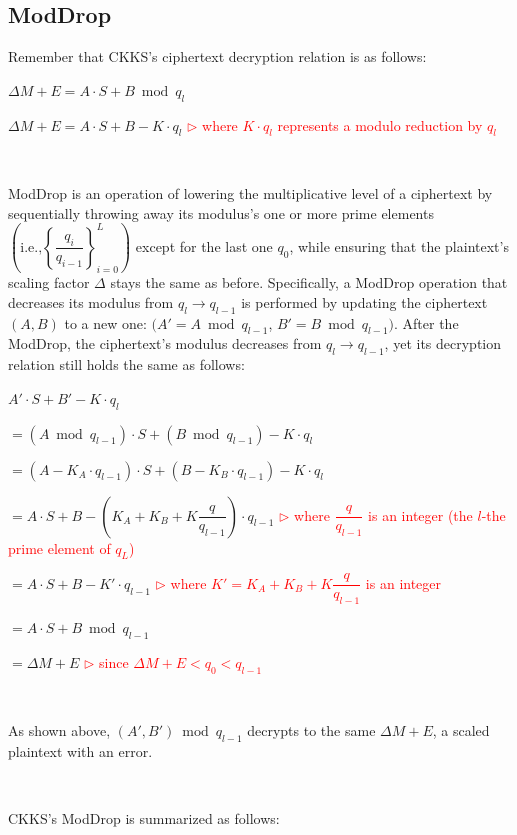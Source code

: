 \subsection{\textsf{ModDrop}}
\label{subsec:ckks-moddrop}

Remember that CKKS's ciphertext decryption relation is as follows:

$\Delta M + E = A \cdot S + B \bmod q_l$

$\Delta M + E = A \cdot S + B - K\cdot q_l$ \textcolor{red}{ $\rhd$ where $K\cdot q_l$ represents a modulo reduction by $q_l$}

$ $

\textsf{ModDrop} is an operation of lowering the multiplicative level of a ciphertext by sequentially throwing away its modulus's one or more prime elements $\left(\text{i.e.,} \left\{\dfrac{q_i}{q_{i-1}}\right\}_{i=0}^{L}\right)$ except for the last one $q_0$, while ensuring that the plaintext's scaling factor $\Delta$ stays the same as before. Specifically, a \textsf{ModDrop} operation that decreases its modulus from $q_l \rightarrow q_{l-1}$ is performed by updating the ciphertext $(A, B)$ to a new one: $\bm(A' = A \bmod q_{l-1}$, $B' = B \bmod q_{l-1})$. After the \textsf{ModDrop}, the ciphertext's modulus decreases from $q_l \rightarrow q_{l-1}$, yet its decryption relation still holds the same as follows:

$A' \cdot S + B' - K\cdot q_l $

$= (A \bmod q_{l-1}) \cdot S + (B \bmod q_{l-1}) - K\cdot q_l$

$= (A - K_A\cdot q_{l-1}) \cdot S + (B - K_B\cdot q_{l-1}) - K\cdot q_l$ 

$= A\cdot S + B - (K_A + K_B + K\dfrac{q}{q_{l-1}})\cdot q_{l-1}$
\textcolor{red}{ $\rhd$ where $\dfrac{q}{q_{l-1}}$ is an integer (the $l$-the prime element of $q_L$)}

$= A\cdot S + B - K'\cdot q_{l-1}$ \textcolor{red}{ $\rhd$ where $K' = K_A + K_B + K\dfrac{q}{q_{l-1}}$ is an integer}

$= A\cdot S + B \bmod q_{l-1}$

$= \Delta M + E$ \textcolor{red}{ $\rhd$ since $\Delta M + E < q_0 < q_{l-1}$}

$ $

As shown above, $(A', B') \bmod q_{l-1}$ decrypts to the same $\Delta M + E$, a scaled plaintext with an error. 

$ $



CKKS's \textsf{ModDrop} is summarized as follows:



